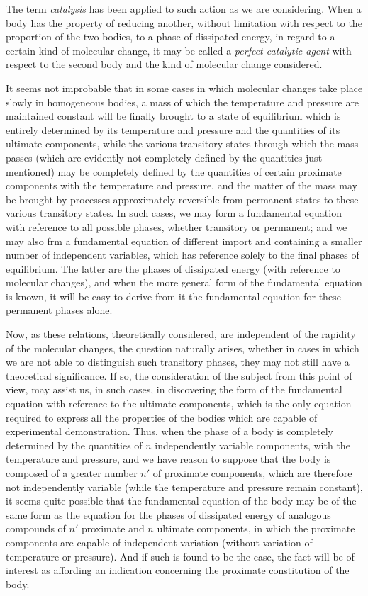 \documentclass[12pt]{memoir}
\begin{document}
The term \textit{catalysis} has been applied to such action as we are considering.  When a body has the property of reducing another, without limitation with respect to the proportion of the two bodies, to a phase of dissipated energy, in regard to a certain kind of molecular change, it may be called a \textit{perfect catalytic agent} with respect to the second body and the kind of molecular change considered.


It seems not improbable that in some cases in which molecular changes take place slowly in homogeneous bodies, a mass of which the temperature and pressure are maintained constant will be finally brought to a state of equilibrium which is entirely determined by its temperature and pressure and the quantities of its ultimate components, while the various transitory states through which the mass passes (which are evidently not completely defined by the quantities just mentioned) may be completely defined by the quantities of certain proximate components with the temperature and pressure, and the matter of the mass may be brought by processes approximately reversible from permanent states to these various transitory states. In such cases, we may form a fundamental equation with reference to all possible phases, whether transitory or permanent; and we may also frm a fundamental equation of different import and containing a smaller number of independent variables, which has reference solely to the final phases of equilibrium. The latter are the phases of dissipated energy (with reference to molecular changes), and when the more general form of the fundamental equation is known, it will be easy to derive from it the fundamental equation for these permanent phases alone.


Now, as these relations, theoretically considered, are independent of the rapidity of the molecular changes, the question naturally arises, whether in cases in which we are not able to distinguish such transitory phases, they may not still have a theoretical significance. If so, the consideration of the subject from this point of view, may assist us, in such cases, in discovering the form of the fundamental equation with reference to the ultimate components, which is the only equation required to express all the properties of the bodies which are capable of experimental demonstration. Thus, when the phase of a body is completely determined by the quantities of $n$ independently variable components, with the temperature and pressure, and we have reason to suppose that the body is composed of a greater number $n'$ of proximate components, which are therefore not independently variable (while the temperature and pressure remain constant), it seems quite possible that the fundamental equation of the body may be of the same form as the equation for the phases of dissipated energy of analogous compounds of $n'$ proximate and $n$ ultimate components, in which the proximate components are capable of independent variation (without variation of temperature or pressure). And if such is found to be the case, the fact will be of interest as affording an indication concerning the proximate constitution of the body.
\end{document}
